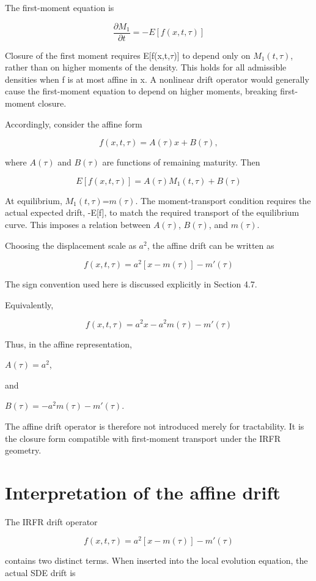 \documentclass[11pt,oneside]{book}
\begin{document}
The first-moment equation is

\[
\frac{\partial M_1}{\partial t} = -E[f(x,t,\tau)]
\]

Closure of the first moment requires E[f(x,t,$\tau$)] to depend only on
$M_1(t,\tau)$, rather than on higher moments of the density. This holds for
all admissible densities when f is at most affine in x. A nonlinear
drift operator would generally cause the first-moment equation to depend
on higher moments, breaking first-moment closure.

Accordingly, consider the affine form

\[
f(x,t,\tau)=A(\tau)x+B(\tau),
\]

where $A(\tau)$ and $B(\tau)$ are functions of remaining maturity. Then

\[
E[f(x,t,\tau)] = A(\tau)M_1(t,\tau)+B(\tau)
\]

At equilibrium, $M_1(t,\tau)$=$m(\tau)$. The moment-transport condition requires
the actual expected drift, -E[f], to match the required transport of
the equilibrium curve. This imposes a relation between $A(\tau)$, $B(\tau)$, and
$m(\tau)$.

Choosing the displacement scale as $a^2$, the affine drift can be written
as

\[
f(x,t,\tau) = a^2[x-m(\tau)] - m'(\tau)
\]

The sign convention used here is discussed explicitly in Section 4.7.

Equivalently,

\[
f(x,t,\tau) = a^2x - a^2m(\tau) - m'(\tau)
\]

Thus, in the affine representation,

$A(\tau)=a^2$,

and

$B(\tau)=-a^2m(\tau)-m'(\tau)$.

The affine drift operator is therefore not introduced merely for
tractability. It is the closure form compatible with first-moment
transport under the IRFR geometry.

\section{Interpretation of the affine
drift}\label{interpretation-of-the-affine-drift}

The IRFR drift operator

\[
f(x,t,\tau) = a^2[x-m(\tau)] - m'(\tau)
\]

contains two distinct terms. When inserted into the local evolution
equation, the actual SDE drift is
\end{document}
